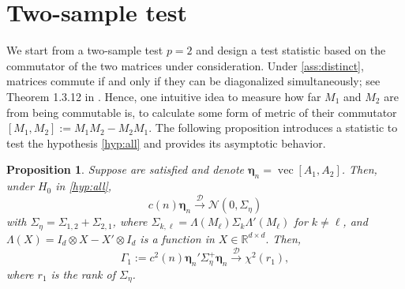 \documentclass[12pt]{article}
\newcommand{\R}{\mathbb{R}}
\numberwithin{thm}{section}
\numberwithin{defn}{section}
\numberwithin{lem}{section}
\newtheorem{prop}{Proposition}
\numberwithin{prop}{section}
\numberwithin{cor}{section}
\numberwithin{rem}{section}
\DeclareMathOperator{\Vector}{vec}
\begin{document}

\vspace{-0.5cm}
\section{Two-sample test}\label{sec:commute}
\vspace{-0.3cm}
We start from a two-sample test $p = 2$ and design a test statistic based on the commutator of the two matrices under consideration. 
Under \autoref{ass:distinct}, matrices commute if and only if they can be diagonalized simultaneously; see Theorem 1.3.12 in \cite{Horn}. Hence, one intuitive idea to measure how far $M_1$ and $M_2$ are from being commutable is, to calculate some form of metric of their commutator $[M_1, M_2] := M_1 M_2-M_2 M_1$. The following proposition introduces a statistic to test the hypothesis \eqref{hyp:all} and provides its asymptotic behavior. 
\begin{prop}\label{thm:comm}
Suppose  are satisfied and denote $\bm{\eta}_n = \Vector[A_1, A_2]$. Then, under $H_0$ in \eqref{hyp:all},
\begin{equation}\label{eq:comm.asym}
    c(n) \bm{\eta}_n \xrightarrow{\mathcal{D}} \mathcal{N}(0, \Sigma_\eta)
\end{equation}
with $\Sigma_\eta = \Sigma_{1,2} + \Sigma_{2,1}$, where $\Sigma_{k, \ell} = \Lambda(M_\ell) \Sigma_k \Lambda'(M_\ell)$ for $k \ne \ell$, and $\Lambda(X) = I_d \otimes X - X' \otimes I_d$ is a function in $X \in \R^{d \times d}.$ Then,
\begin{equation}\label{eqn:gamma2}
    \Gamma_1 := c^2(n) \bm{\eta}_n' \Sigma_\eta^+ \bm{\eta}_n \xrightarrow{\mathcal{D}} \chi^2(r_1),
\end{equation}
where $r_1$ is the rank of $\Sigma_\eta$.
\end{prop}
\end{document}
